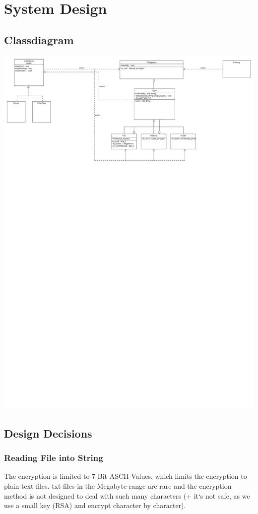 \section{System Design}
\newpage
\subsection{Classdiagram}
\includegraphics[scale=1, angle=90]{../ClassDiagram.pdf}

\subsection{Design Decisions}
\subsubsection{Reading File into String}
The encryption is limited to 7-Bit ASCII-Values, which limits the encryption to plain text files. txt-files in the Megabyte-range are rare and the encryption method is not designed to deal with such many characters (+ it`s not safe, as we use a small key (RSA) and encrypt character by character).
